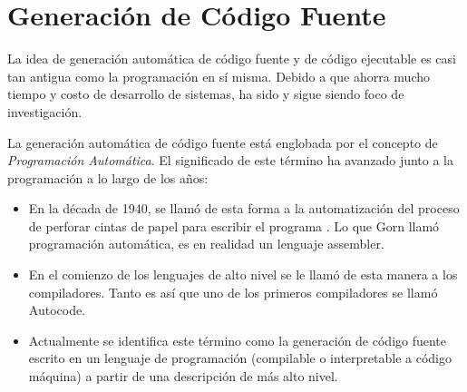 \section{Generación de Código Fuente}

La idea de generación automática de código fuente y de código ejecutable es casi
tan antigua como la programación en sí misma. Debido a que ahorra mucho
tiempo y costo de desarrollo de sistemas, ha sido y sigue siendo foco de
investigación.

La generación automática de código fuente está englobada por el concepto de
\textit{Programación Automática}. El significado de este término ha avanzado
junto a la programación a lo largo de los años:
\begin{itemize}
  \item En la década de 1940, se llamó de esta forma a la automatización del
  proceso de perforar cintas de papel para escribir el programa
  \cite{AutomaticProgrammingGorn}. Lo que Gorn llamó programación automática, es
  en realidad un lenguaje assembler.
  \item En el comienzo de los lenguajes de alto nivel se le llamó de esta manera
  a los compiladores. Tanto es así que uno de los primeros compiladores se llamó
  Autocode.
  \item Actualmente se identifica este término como la generación de código
  fuente escrito en un lenguaje de programación (compilable o interpretable a
  código máquina) a partir de una descripción de más alto nivel.
\end{itemize}

